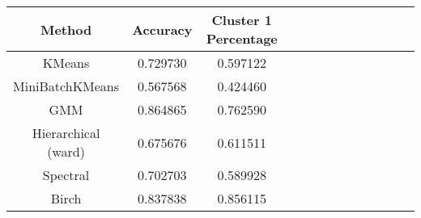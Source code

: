 \begin{tabular}{ccccccccccccc}
\toprule
             Method &  Accuracy &  Cluster 1 Percentage \\
\midrule
             KMeans &  0.729730 &              0.597122 \\
    MiniBatchKMeans &  0.567568 &              0.424460 \\
                GMM &  0.864865 &              0.762590 \\
Hierarchical (ward) &  0.675676 &              0.611511 \\
           Spectral &  0.702703 &              0.589928 \\
              Birch &  0.837838 &              0.856115 \\
\bottomrule
\end{tabular}

